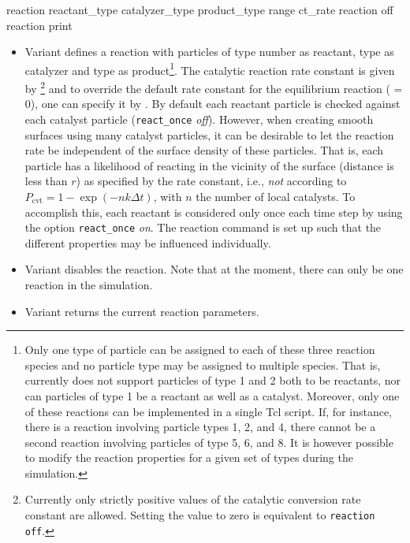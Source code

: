 \begin{essyntax}
 reaction reactant_type  catalyzer_type  
product_type  range  ct_rate 
 
 reaction off
 reaction print
\begin{features}
\end{features}
\end{essyntax}

\begin{itemize}
\item Variant  defines a reaction with particles of type
  number  as reactant, type  as catalyzer and type
   as product\footnote{Only one type of particle can be
    assigned to each of these three reaction species and no particle
    type may be assigned to multiple species. That is, \es currently
    does not support particles of type 1 and 2 both to be reactants,
    nor can particles of type 1 be a reactant as well as a
    catalyst. Moreover, only one of these reactions can be implemented
    in a single Tcl script. If, for instance, there is a reaction
    involving particle types 1, 2, and 4, there cannot be a second
    reaction involving particles of type 5, 6, and 8. It is however
    possible to modify the reaction properties for a given set of
    types during the simulation.}. The catalytic reaction rate
  constant is given by \footnote{Currently only strictly
    positive values of the catalytic conversion rate constant are
    allowed. Setting the value to zero is equivalent to
    \texttt{reaction off}.} and to override the default rate constant
  for the equilibrium reaction ( = 0), one can specify it
  by . By default each reactant particle is checked against
  each catalyst particle (\texttt{react\_once} \emph{off}). However,
  when creating smooth surfaces using many catalyst particles, it can
  be desirable to let the reaction rate be independent of the surface
  density of these particles. That is, each particle has a likelihood
  of reacting in the vicinity of the surface (distance is less than
  $r$) as specified by the rate constant, i.e., \emph{not} according
  to $P_{\text{cvt}} = 1 - \exp \left( - n k\Delta t \right)$, with
  $n$ the number of local catalysts. To accomplish this, each reactant
  is considered only once each time step by using the option
  \texttt{react\_once} \emph{on}. The reaction command is set up such
  that the different properties may be influenced individually.
\item Variant  disables the reaction. Note that at the
  moment, there can only be one reaction in the simulation.
\item Variant  returns the current reaction parameters.
\end{itemize}


